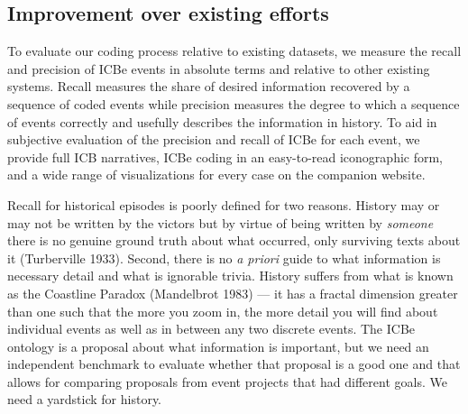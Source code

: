 \documentclass{article}
\begin{document}
\hypertarget{improvement-over-existing-efforts}{%
\subsection{Improvement over existing
efforts}\label{improvement-over-existing-efforts}}

To evaluate our coding process relative to existing datasets, we measure
the recall and precision of ICBe events in absolute terms and relative
to other existing systems. Recall measures the share of desired
information recovered by a sequence of coded events while precision
measures the degree to which a sequence of events correctly and usefully
describes the information in history. To aid in subjective evaluation of
the precision and recall of ICBe for each event, we provide full ICB
narratives, ICBe coding in an easy-to-read iconographic form, and a wide
range of visualizations for every case on the companion website.

Recall for historical episodes is poorly defined for two reasons.
History may or may not be written by the victors but by virtue of being
written by \emph{someone} there is no genuine ground truth about what
occurred, only surviving texts about it (Turberville 1933). Second,
there is no \emph{a priori} guide to what information is necessary
detail and what is ignorable trivia. History suffers from what is known
as the Coastline Paradox (Mandelbrot 1983) --- it has a fractal
dimension greater than one such that the more you zoom in, the more
detail you will find about individual events as well as in between any
two discrete events. The ICBe ontology is a proposal about what
information is important, but we need an independent benchmark to
evaluate whether that proposal is a good one and that allows for
comparing proposals from event projects that had different goals. We
need a yardstick for history.
\end{document}
